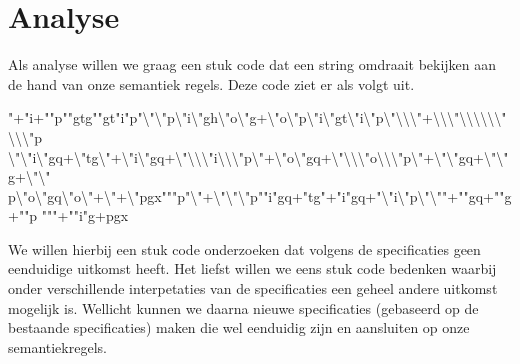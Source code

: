\section{Analyse}
\label{sec:analyse}
Als analyse willen we graag een stuk code dat een string omdraait bekijken aan de hand van onze semantiek regels. Deze code ziet er als volgt uit. 
	\begin{smurf}
	\footnotesize
	"+"i+""p""gtg""gt"i"p"\backslash"\backslash"p\backslash"i\backslash"gh\backslash"o\backslash"g+\backslash"o\backslash"p\backslash"i\backslash"gt\backslash"i\backslash"p\backslash"\backslash\backslash\backslash"+\backslash\backslash\backslash"\backslash\backslash\backslash\backslash\backslash\backslash"\backslash\backslash\backslash"p
    \backslash"\backslash"i\backslash"gq+\backslash"tg\backslash"+\backslash"i\backslash"gq+\backslash"\backslash\backslash\backslash"i\backslash\backslash\backslash"p\backslash"+\backslash"o\backslash"gq+\backslash"\backslash\backslash\backslash"o\backslash\backslash\backslash"p\backslash"+\backslash"\backslash"gq+\backslash"\backslash"g+\backslash"\backslash"
    p\backslash"o\backslash"gq\backslash"o\backslash"+\backslash"+\backslash"pgx"""p"\backslash"+\backslash"\backslash"\backslash"p""i"gq+"tg"+"i"gq+"\backslash"i\backslash"p\backslash"\backslash""+""gq+""g+""p
    """+""i"g+pgx
	\end{smurf}
	
We willen hierbij een stuk code onderzoeken dat volgens de specificaties geen eenduidige uitkomst heeft. Het liefst willen we eens stuk code bedenken waarbij onder verschillende interpetaties van de specificaties een geheel andere uitkomst mogelijk is. Wellicht kunnen we daarna nieuwe specificaties (gebaseerd op de bestaande specificaties) maken die wel eenduidig zijn en aansluiten op onze semantiekregels. 